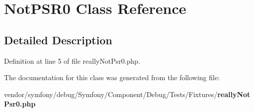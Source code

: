 \section{Not\+P\+S\+R0 Class Reference}
\label{class_symfony_1_1_component_1_1_debug_1_1_tests_1_1_fixtures_1_1_not_p_s_r0}


\subsection{Detailed Description}


Definition at line 5 of file really\+Not\+Psr0.\+php.



The documentation for this class was generated from the following file\+:\begin{DoxyCompactItemize}
\item 
vendor/symfony/debug/\+Symfony/\+Component/\+Debug/\+Tests/\+Fixtures/{\bf really\+Not\+Psr0.\+php}\end{DoxyCompactItemize}
